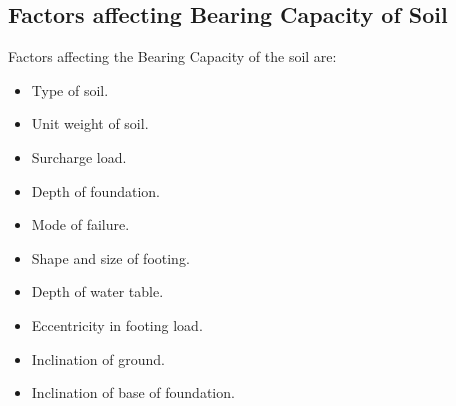 \subsection{Factors affecting Bearing Capacity of Soil}
Factors affecting the Bearing Capacity of the soil are:\\
\begin{minipage}[t]{0.4\linewidth}
\begin{itemize}
\item	Type of soil.
\item	Unit weight of soil.
\item	Surcharge load.
\item	Depth of foundation.
\item	Mode of failure.
\end{itemize}
\end{minipage}\ignorespaces%
\begin{minipage}[t]{0.5\linewidth}
\begin{itemize}
\item	Shape and size of footing.
\item	Depth of water table.
\item	Eccentricity in footing load.
\item	Inclination of ground.
\item	Inclination of base of foundation.
\end{itemize}
\end{minipage}\\

